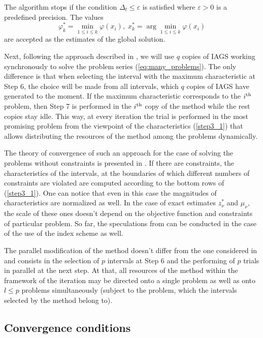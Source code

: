 \documentclass[runningheads]{llncs}
\begin{document}
The algorithm stops if the condition \(\Delta_{t}\leqslant \varepsilon\) is satisfied where
\(\varepsilon>0\) is a predefined precision.
The values
\begin{equation}
\varphi_k^*=\min_{1\leqslant i \leqslant k}\varphi(x_i), \; x_k^*=\arg \min_{1\leqslant i \leqslant
k}\varphi(x_i)
\end{equation}
are accepted as the estimates of the global solution.

Next, following the approach described in \cite{BarkalovStrongin2018}, we will use \(q\) copies
of IAGS working synchronously to solve the problem series (\ref{eq:many_problems}).
The only difference is that when selecting the interval with the maximum characteristic at Step
6, the choice will be made from all intervals, which \(q\) copies of IAGS have generated to the
moment.
If the maximum characteristic corresponds to the \(i^{\rm th}\) problem, then Step 7 is
performed in the \(i^{\rm th}\) copy of the method while the rest copies stay idle.
This way, at every iteration the trial is performed in the most promising problem from the
viewpoint of the characteristics (\ref{step3_1}) that allows distributing the resources of the
method among the problems dynamically.

The theory of convergence of such an approach for the case of solving the problems without
constraints is presented in \cite{BarkalovStrongin2018}.
If there are constraints, the characteristics of the intervals, at the boundaries of which different
numbers of constraints are violated are computed according to the bottom rows of
(\ref{step3_1}).
One can notice that even in this case the magnitudes of characteristics are normalized as well.
In the case of exact estimates \(z_{\nu }^{*}\) and \(\mu _{\nu }\), the scale of these ones
doesn't depend on the objective function and constraints of particular problem.
So far, the speculations from \cite{BarkalovStrongin2018} can be conducted in the case of the
use of the index scheme as well.

The parallel modification of the method doesn't differ from the one considered in
\cite{BarkalovStrongin2018} and consists in the selection of \(p\) intervals at Step 6 and the
performing of \(p\) trials in parallel at the next step.
At that, all resources of the method within the framework of the iteration may be directed onto
a single problem as well as onto \(l\leqslant p\) problems simultaneously (subject to the problem,
which the intervals selected by the method belong to).

\subsection{Convergence conditions }
\label{sec:conv_method}
\end{document}
